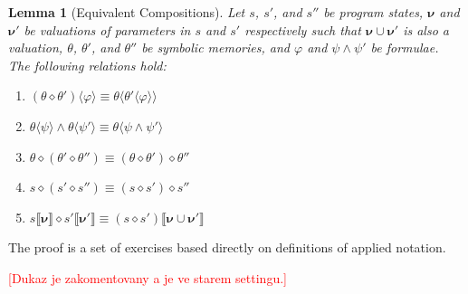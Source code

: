 \documentclass{sig-alternate}%
\newtheorem{lem}{Lemma}%
\newcommand{\todo}[1]{{\scriptsize{{\textcolor{red}{[#1]}}}}}
\newcommand{\prm}[1]{\ensuremath{\llbracket #1 \rrbracket}}
\newcommand{\ese}[1]{\ensuremath{\langle #1 \rangle}}
\newcommand{\bld}[1]{\ensuremath{\boldsymbol{#1}}}
\newcommand{\compose}{\ensuremath{\diamond}}
\begin{document}
\begin{lem}[Equivalent Compositions]\label{lem:EquivalentCompositions}
  Let $s$, $s'$, and $s''$ be program states, $\bld{\nu}$ and $\bld{\nu}'$
  be valuations of parameters in $s$ and $s'$ respectively such that
  $\bld{\nu} \cup \bld{\nu}'$ is also a valuation, $\theta$, $\theta'$, and
  $\theta''$ be symbolic memories, and $\varphi$ and $\psi \wedge \psi'$ be
  formulae. The following relations hold:
  \begin{enumerate}
  \item $(\theta \compose \theta')\ese{\varphi} \equiv
    \theta\ese{\theta'\ese{\varphi}}$
  \item $\theta\ese{\psi} \wedge \theta\ese{\psi'} \equiv \theta\ese{\psi
      \wedge \psi'}$
  \item $\theta \compose (\theta' \compose \theta'') \equiv (\theta \compose
    \theta') \compose \theta''$
  \item $s \compose (s' \compose s'') \equiv (s \compose s') \compose s''$
  \item $s\prm{\bld{\nu}} \compose s'\prm{\bld{\nu}'} \equiv (s \compose
    s')\prm{\bld{\nu} \cup \bld{\nu}'}$
  \end{enumerate}
\end{lem}
The proof is a set of exercises based directly on definitions of applied
notation.

\todo{Dukaz je zakomentovany a je ve starem settingu.}

\end{document}
